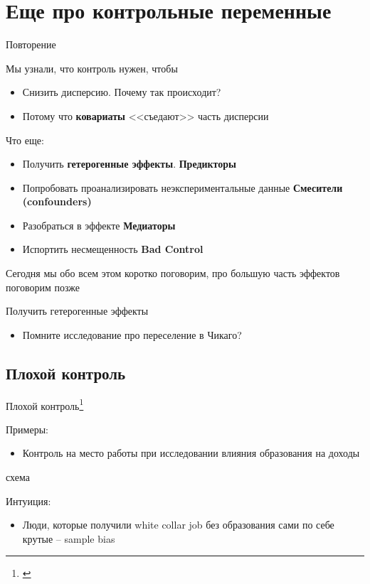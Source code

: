
\section{Еще про контрольные переменные}

\begin{frame}{Повторение}

Мы узнали, что контроль нужен, чтобы
\begin{itemize}[<+->]
    \item Снизить дисперсию. Почему так происходит?
    \item Потому что \textbf{ковариаты} <<съедают>> часть дисперсии
\end{itemize}

\pause
Что еще:

\begin{itemize}
    \item Получить \textbf{гетерогенные эффекты}. \textbf{Предикторы}
    \item Попробовать проанализировать неэкспериментальные данные \textbf{Смесители (confounders)}
    \item Разобраться в эффекте \textbf{Медиаторы}
    \item Испортить несмещенность \textbf{Bad Control}
\end{itemize}

Сегодня мы обо всем этом коротко поговорим, про большую часть эффектов поговорим позже
    
\end{frame}

\begin{frame}{Получить гетерогенные эффекты}
\begin{itemize}
    \item Помните исследование про переселение в Чикаго?
\end{itemize}
\end{frame}

\subsection{Плохой контроль}

\begin{frame}{Плохой контроль\footnote{\cite[Глава 3.2.3]{angrist2008mostly}}}

Примеры:
\begin{itemize}
    \item Контроль на место работы при исследовании влияния образования на доходы
\end{itemize}

схема

Интуиция:
\begin{itemize}
    \item Люди, которые получили white collar job без образования сами по себе крутые -- sample bias
\end{itemize}

\end{frame}

